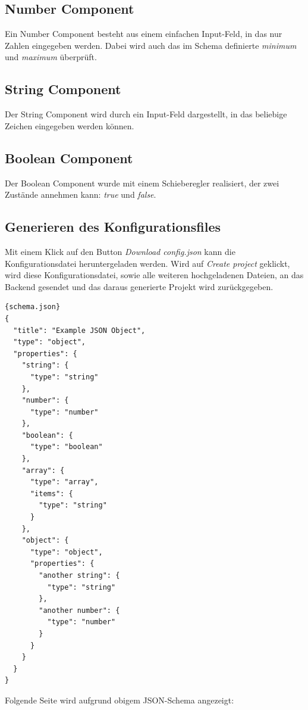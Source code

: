 \subsection{Number Component}
Ein Number Component besteht aus einem einfachen Input-Feld, in das nur Zahlen eingegeben werden.
Dabei wird auch das im Schema definierte \textit{minimum} und \textit{maximum} überprüft.

\subsection{String Component}
Der String Component wird durch ein Input-Feld dargestellt, in das beliebige Zeichen eingegeben werden können.

\subsection{Boolean Component}
Der Boolean Component wurde mit einem Schieberegler realisiert, der zwei Zustände annehmen kann: \textit{true} und
\textit{false}.

\subsection{Generieren des Konfigurationsfiles}
Mit einem Klick auf den Button \textit{Download config.json} kann die Konfigurationsdatei heruntergeladen werden.
Wird auf \textit{Create project} geklickt, wird diese Konfigurationsdatei, sowie alle weiteren hochgeladenen Dateien, an
das Backend gesendet und das daraus generierte Projekt wird zurückgegeben.

\begin{lstlisting}[label={lst:schema.json}]{schema.json}
{
  "title": "Example JSON Object",
  "type": "object",
  "properties": {
    "string": {
      "type": "string"
    },
    "number": {
      "type": "number"
    },
    "boolean": {
      "type": "boolean"
    },
    "array": {
      "type": "array",
      "items": {
        "type": "string"
      }
    },
    "object": {
      "type": "object",
      "properties": {
        "another string": {
          "type": "string"
        },
        "another number": {
          "type": "number"
        }
      }
    }
  }
}
\end{lstlisting}

Folgende Seite wird aufgrund obigem JSON-Schema angezeigt:

